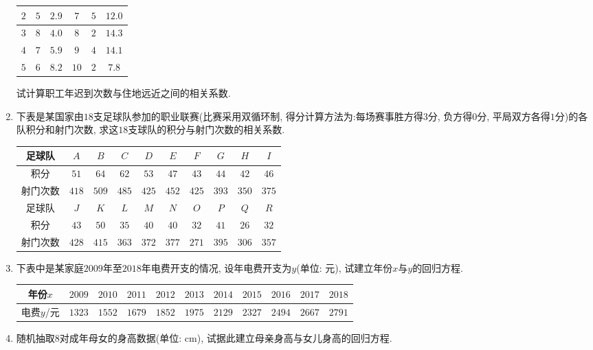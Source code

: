 \documentclass[10pt,a4paper]{article}
\begin{document}
\begin{enumerate}[1.]
\begin{center}
\begin{tabular}{|c|c|c|c|c|c|}
$2$ & $5$ & $2.9$ & $7$ & $5$ & $12.0$ \\ \hline
$3$ & $8$ & $4.0$ & $8$ & $2$ & $14.3$ \\ \hline
$4$ & $7$ & $5.9$ & $9$ & $4$ & $14.1$ \\ \hline
$5$ & $6$ & $8.2$ & $10$ & $2$ & $7.8$ \\ \hline
\end{tabular}
\end{center}
试计算职工年迟到次数与住地远近之间的相关系数.
\item 下表是某国家由$18$支足球队参加的职业联赛(比赛采用双循环制, 得分计算方法为:每场赛事胜方得$3$分, 负方得$0$分, 平局双方各得$1$分)的各队积分和射门次数, 求这$18$支球队的积分与射门次数的相关系数.
\begin{center}
\begin{tabular}{|c|c|c|c|c|c|c|c|c|c|}
\hline
足球队 & $A$ & $B$ & $C$ & $D$ & $E$ & $F$ & $G$ & $H$ & $I$ \\ \hline
积分 & $51$ & $64$ & $62$ & $53$ & $47$ & $43$ & $44$ & $42$ & $46$ \\ \hline
射门次数 & $418$ & $509$ & $485$ & $425$ & $452$ & $425$ & $393$ & $350$ & $375$ \\ \hline
足球队 & $J$ & $K$ & $L$ & $M$ & $N$ & $O$ & $P$ & $Q$ & $R$ \\ \hline
积分 & $43$ & $50$ & $35$ & $40$ & $40$ & $32$ & $41$ & $26$ & $32$ \\ \hline
射门次数 & $428$ & $415$ & $363$ & $372$ & $377$ & $271$ & $395$ & $306$ & $357$ \\ \hline
\end{tabular}
\end{center}
\item 下表中是某家庭$2009$年至$2018$年电费开支的情况, 设年电费开支为$y$(单位: 元), 试建立年份$x$与$y$的回归方程.
\begin{center}
\begin{tabular}{|c|c|c|c|c|c|c|c|c|c|c|}
\hline
年份$x$ & $2009$ & $2010$ & $2011$ & $2012$ & $2013$ & $2014$ & $2015$ & $2016$ & $2017$ & $2018$ \\ \hline
电费$y$/元 & $1323$ & $1552$ & $1679$ & $1852$ & $1975$ & $2129$ & $2327$ & $2494$ & $2667$ & $2791$ \\ \hline
\end{tabular}
\end{center}
\item 随机抽取$8$对成年母女的身高数据(单位: $\text{cm}$), 试据此建立母亲身高与女儿身高的回归方程.
\begin{center}

\end{center}
\end{enumerate}
\end{document}
